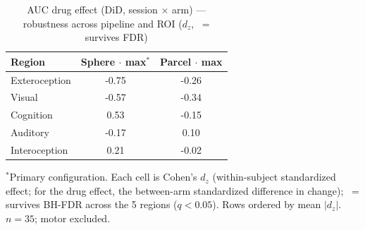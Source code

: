 \begin{table}[htbp]\centering
\caption{AUC drug effect (DiD, session $\times$ arm) --- robustness across pipeline and ROI ($d_z$, \checkmark\ = survives FDR)}
\label{tab:supp_drug_auc}
\small\setlength{\tabcolsep}{6pt}
\begin{tabular}{lcc}
\toprule
Region & Sphere $\cdot$ max$^{*}$ & Parcel $\cdot$ max \\
\midrule
Exteroception & -0.75 & -0.26 \\
Visual & -0.57 & -0.34 \\
Cognition & 0.53 & -0.15 \\
Auditory & -0.17 & 0.10 \\
Interoception & 0.21 & -0.02 \\
\bottomrule
\end{tabular}
\begin{flushleft}\footnotesize $^{*}$Primary configuration. Each cell is Cohen's $d_z$ (within-subject standardized effect; for the drug effect, the between-arm standardized difference in change); \checkmark\ = survives BH-FDR across the 5 regions ($q<0.05$). Rows ordered by mean $|d_z|$. $n=35$; motor excluded.\end{flushleft}
\end{table}
